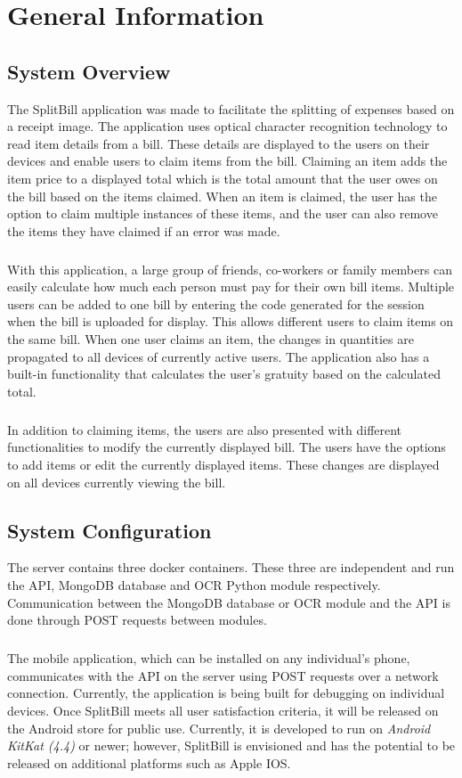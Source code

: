 \documentclass[12pt,a4paper]{article}
\begin{document}
\section{General Information}
	\subsection{System Overview}
   The SplitBill application was made to facilitate the splitting of expenses based on a receipt image. The application uses optical character recognition technology to read item details from a bill. These details are displayed to the users on their devices and enable users to claim items from the bill. Claiming an item adds the item price to a displayed total which is the total amount that the user owes on the bill based on the items claimed. When an item is claimed, the user has the option to claim multiple instances of these items, and the user can also remove the items they have claimed if an error was made.  
     \subparagraph{}
     With this application, a large group of friends, co-workers or family members can easily calculate how much each person must pay for their own bill items.  
   Multiple users can be added to one bill by entering the code generated for the session when the bill is uploaded for display. This allows different users to claim items on the same bill. When one user claims an item, the changes in quantities are propagated to all devices of currently active users. The application also has a built-in functionality that calculates the user's gratuity based on the calculated total. 
   \subparagraph{}
   In addition to claiming items, the users are also presented with different functionalities to modify the currently displayed bill. The users have the options to add items or edit the currently displayed items. These changes are displayed on all devices currently viewing the bill. 
   
    \subsection{System Configuration} 
   The server contains three docker containers. These three are independent and run the API, MongoDB database and OCR Python module respectively. Communication between the MongoDB database or OCR module and the API is done through POST requests between modules.
   
   \subparagraph{} The mobile application, which can be installed on any individual’s phone, communicates with the API on the server using POST requests over a network connection. Currently, the application is being built for debugging on individual devices. Once SplitBill meets all user satisfaction criteria, it will be released on the Android store for public use. Currently, it is developed to run on \emph{Android KitKat (4.4)} or newer; however, SplitBill is envisioned and has the potential to be released on additional platforms such as Apple IOS. 
 
\end{document}
